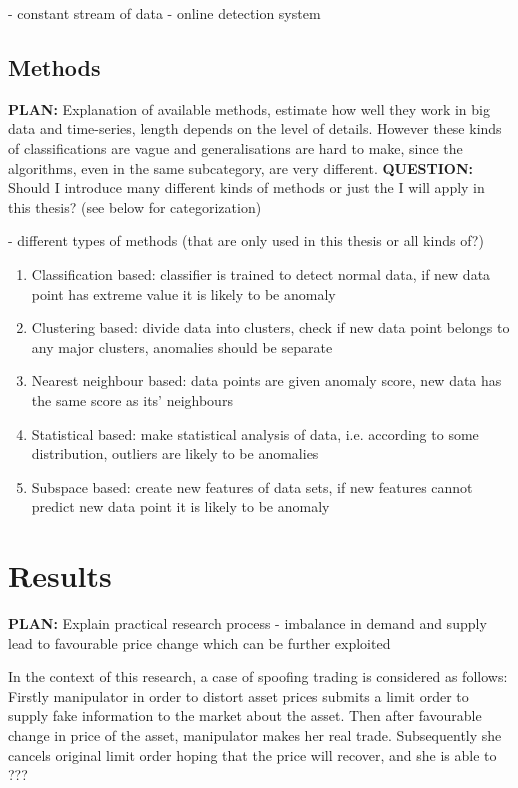 \documentclass{tut-thesis}
\begin{document}
- constant stream of data
- online detection system


\section{Methods}
\textbf{PLAN:} Explanation of available methods, estimate how well they work in big data and time-series, length depends on the level of details. However these kinds of classifications are vague and generalisations are hard to make, since the algorithms, even in the same subcategory, are very different. 
\textbf{QUESTION:} Should I introduce many different kinds of methods or just the I will apply in this thesis? (see below for categorization)

- different types of methods (that are only used in this thesis or all kinds of?)
\begin{enumerate}
	\item Classification based: classifier is trained to detect normal data, if new data point has extreme value it is likely to be anomaly
	\item Clustering based: divide data into clusters, check if new data point belongs to any major clusters, anomalies should be separate 
	\item Nearest neighbour based: data points are given anomaly score, new data has the same score as its' neighbours
	\item Statistical based: make statistical analysis of data, i.e. according to some distribution, outliers are likely to be anomalies
	\item Subspace based: create new features of data sets, if new features cannot predict new data point it is likely to be anomaly
\end{enumerate}

\chapter{Results}
\textbf{PLAN:} Explain practical research process
- imbalance in demand and supply lead to favourable price change which can be further exploited

In the context of this research, a case of spoofing trading is considered as follows: Firstly manipulator in order to distort asset prices submits a limit order to supply fake information to the market about the asset. Then after favourable change in price of the asset, manipulator makes her real trade. Subsequently she cancels original limit order hoping that the price will recover, and she is able to ???
\end{document}
